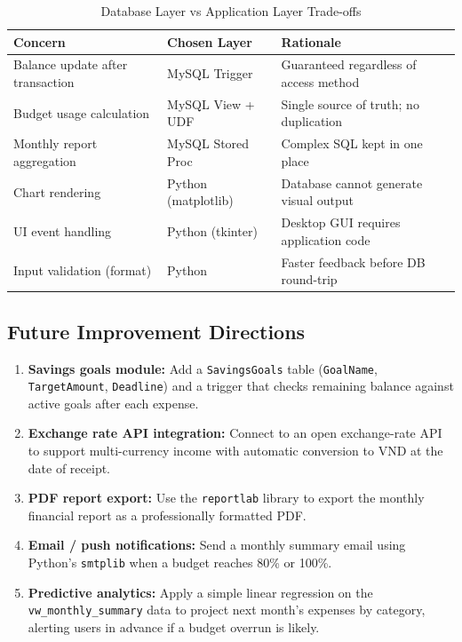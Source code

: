\documentclass[12pt, a4paper]{article}
\begin{document}
\begin{table}[H]
\centering
\caption{Database Layer vs Application Layer Trade-offs}
\begin{tabularx}{\textwidth}{Xll}
\toprule
\textbf{Concern} & \textbf{Chosen Layer} & \textbf{Rationale} \\
\midrule
Balance update after transaction & MySQL Trigger      & Guaranteed regardless of access method \\
Budget usage calculation         & MySQL View + UDF   & Single source of truth; no duplication \\
Monthly report aggregation       & MySQL Stored Proc  & Complex SQL kept in one place \\
Chart rendering                  & Python (matplotlib)& Database cannot generate visual output \\
UI event handling                & Python (tkinter)   & Desktop GUI requires application code \\
Input validation (format)        & Python             & Faster feedback before DB round-trip \\
\bottomrule
\end{tabularx}
\end{table}

\subsection{Future Improvement Directions}

\begin{enumerate}[leftmargin=2em]
  \item \textbf{Savings goals module:} Add a \texttt{SavingsGoals} table
        (\texttt{GoalName}, \texttt{TargetAmount}, \texttt{Deadline}) and a trigger
        that checks remaining balance against active goals after each expense.
  \item \textbf{Exchange rate API integration:} Connect to an open exchange-rate API
        to support multi-currency income with automatic conversion to VND at the date
        of receipt.
  \item \textbf{PDF report export:} Use the \texttt{reportlab} library to export the
        monthly financial report as a professionally formatted PDF.
  \item \textbf{Email / push notifications:} Send a monthly summary email using
        Python's \texttt{smtplib} when a budget reaches 80\% or 100\%.
  \item \textbf{Predictive analytics:} Apply a simple linear regression on the
        \texttt{vw\_monthly\_summary} data to project next month's expenses by
        category, alerting users in advance if a budget overrun is likely.
\end{enumerate}
\end{document}
